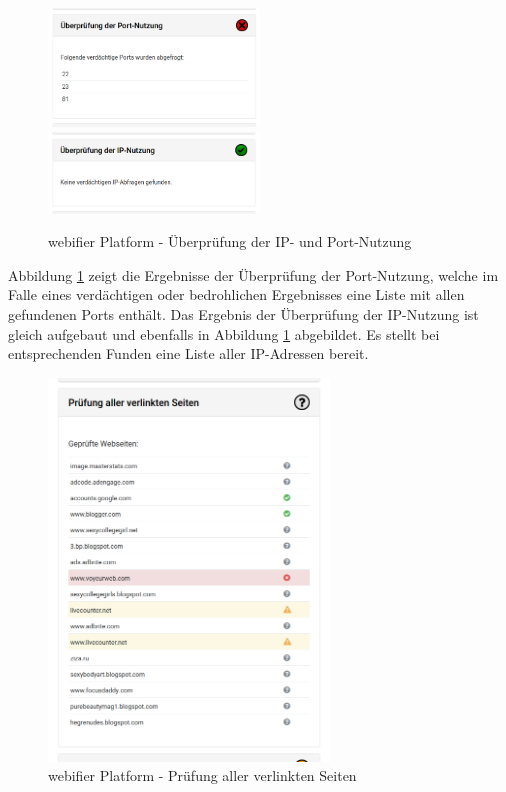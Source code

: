 \begin{figure}[H]
\centerline{%
\includegraphics[width=0.5\textwidth]{images/platform/portscan-malicious}%
\includegraphics[width=0.5\textwidth]{images/platform/ipscan-clean}%
}%
\caption{webifier Platform - Überprüfung der IP- und Port-Nutzung}
\label{fig:platform-result-portscan}
\end{figure}

Abbildung \ref{fig:platform-result-portscan} zeigt die Ergebnisse der Überprüfung der Port-Nutzung, welche im Falle eines verdächtigen oder bedrohlichen Ergebnisses eine Liste mit allen gefundenen Ports enthält. Das Ergebnis der Überprüfung der IP-Nutzung ist gleich aufgebaut und ebenfalls in Abbildung \ref{fig:platform-result-portscan} abgebildet. Es stellt bei entsprechenden Funden eine Liste aller IP-Adressen bereit.

\begin{figure}[H]
  \centering
  \includegraphics[width=7.5cm]{images/platform/linkchecker-undefined}
  \caption{webifier Platform - Prüfung aller verlinkten Seiten}
  \label{fig:platform-result-linkchecker}
\end{figure}

